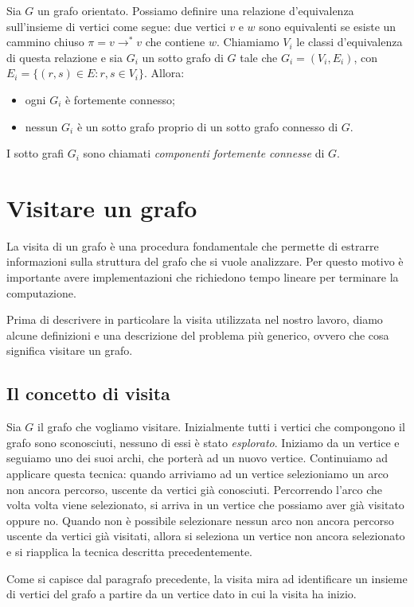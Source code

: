 Sia $G$ un grafo orientato. Possiamo definire una relazione
d'equivalenza sull'insieme di vertici come segue: due vertici $v$ e
$w$ sono equivalenti se esiste un cammino chiuso $\pi = v
\rightarrow^{*} v$ che contiene $w$. Chiamiamo $V_{i}$ le classi
d'equivalenza di questa relazione e sia $G_{i}$ un sotto grafo di $G$
tale che $G_{i} = (V_{i}, E_{i})$, con $E_{i} = \{(r,s) \in E: r,s \in
V_{i} \}$. Allora:
\begin{itemize}
\item ogni $G_{i}$ \`e fortemente connesso;
\item nessun $G_{i}$ \`e un sotto grafo proprio di un sotto grafo
  connesso di $G$.
\end{itemize}
I sotto grafi $G_{i}$ sono chiamati \emph{componenti fortemente
  connesse} di $G$.


\section{Visitare un grafo}

La visita di un grafo \`e una procedura fondamentale che permette di
estrarre informazioni sulla struttura del grafo che si vuole
analizzare. Per questo motivo \`e importante avere implementazioni che
richiedono tempo lineare per terminare la computazione.

Prima di descrivere in particolare la visita utilizzata nel nostro
lavoro, diamo alcune definizioni e una descrizione del problema pi\`u
generico, ovvero che cosa significa visitare un grafo.


\subsection{Il concetto di visita}
Sia $G$ il grafo che vogliamo visitare. Inizialmente tutti i vertici
che compongono il grafo sono sconosciuti, nessuno di essi \`e stato
\emph{esplorato}. Iniziamo da un vertice e seguiamo uno dei suoi
archi, che porter\`a ad un nuovo vertice. Continuiamo ad applicare
questa tecnica: quando arriviamo ad un vertice selezioniamo un arco
non ancora percorso, uscente da vertici gi\`a conosciuti. Percorrendo
l'arco che volta volta viene selezionato, si arriva in un vertice che
possiamo aver gi\`a visitato oppure no. Quando non \`e possibile
selezionare nessun arco non ancora percorso uscente da vertici gi\`a
visitati, allora si seleziona un vertice non ancora selezionato e si
riapplica la tecnica descritta precedentemente.

Come si capisce dal paragrafo precedente, la visita mira ad
identificare un insieme di vertici del grafo a partire da un vertice
dato in cui la visita ha inizio.

